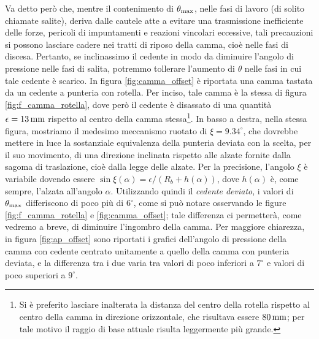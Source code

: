 \noindent Va detto per\`o che, mentre il contenimento di $\theta_{\rm max}$, nelle
fasi di lavoro (di solito chiamate salite),
deriva dalle cautele atte a  evitare una trasmissione
inefficiente delle forze, pericoli di impuntamenti e reazioni vincolari eccessive,
tali precauzioni si possono lasciare cadere 
nei tratti di riposo della camma, cio\`e nelle fasi  di discesa.
Pertanto, se inclinassimo il cedente in modo da diminuire l'angolo di pressione 
nelle fasi di salita, potremmo tollerare l'aumento di $\theta$
nelle fasi in cui tale cedente \`e scarico.
In figura \ref{fig:camma_offset} \`e riportata una camma tastata da un cedente a punteria con
rotella. Per inciso, tale camma \`e la stessa di figura
\ref{fig:f_camma_rotella}, dove per\`o il cedente
\`e disassato di una quantit\`a $\epsilon= 13\,{\rm mm}$ rispetto al centro
della camma stessa\footnote{Si \`e preferito lasciare inalterata la distanza del centro della rotella rispetto al centro della camma
in direzione orizzontale, che risultava essere
$80\,{\rm mm}$; per tale motivo il raggio di base attuale risulta leggermente pi\`u grande.}.
In basso a destra, nella stessa figura, mostriamo il medesimo meccanismo
ruotato di $\xi=9.34^{\circ}$, che dovrebbe mettere in luce la sostanziale
equivalenza della punteria deviata
con la scelta, per il suo movimento, di una direzione inclinata rispetto alle
 alzate fornite dalla sagoma di traslazione, cio\`e dalla legge delle alzate.
Per la precisione,
 l'angolo $\xi$ \`e variabile dovendo essere
$\sin\xi(\alpha)=\epsilon / (R_b + h(\alpha))$, dove $h(\alpha)$
\`e, come sempre, l'alzata all'angolo $\alpha$.
Utilizzando quindi il {\em cedente deviato},
i valori di $\theta_{\rm max}$
 differiscono di poco pi\`u di $6^{\circ}$,
 come si pu\`o notare osservando le figure \ref{fig:f_camma_rotella} e
 \ref{fig:camma_offset};
tale differenza
ci permetter\`a, come vedremo a breve, di diminuire l'ingombro della camma.
Per maggiore chiarezza, in figura \ref{fig:ap_offset} sono
riportati i grafici dell'angolo di pressione della camma con
cedente centrato unitamente a quello della
camma con punteria deviata, e la differenza tra i due varia
tra valori di poco inferiori a
$7^{\circ}$ e valori di poco superiori a $9^{\circ}$.

